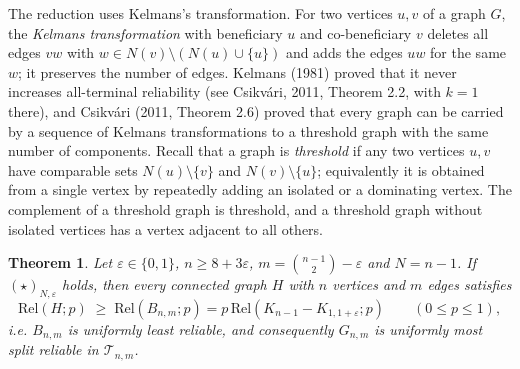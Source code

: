 \documentclass[
  11pt,
]{article}
\newtheorem{theorem}{Theorem}[section]
\theoremstyle{definition}
\theoremstyle{remark}
\begin{document}
The reduction uses Kelmans's transformation. For two vertices \(u,v\) of
a graph \(G\), the \emph{Kelmans transformation} with beneficiary \(u\)
and co-beneficiary \(v\) deletes all edges \(vw\) with
\(w\in N(v)\setminus(N(u)\cup\{u\})\) and adds the edges \(uw\) for the
same \(w\); it preserves the number of edges. Kelmans (1981) proved that
it never increases all-terminal reliability (see Csikvári, 2011, Theorem
2.2, with \(k=1\) there), and Csikvári (2011, Theorem 2.6) proved that
every graph can be carried by a sequence of Kelmans transformations to a
threshold graph with the same number of components. Recall that a graph
is \emph{threshold} if any two vertices \(u,v\) have comparable sets
\(N(u)\setminus\{v\}\) and \(N(v)\setminus\{u\}\); equivalently it is
obtained from a single vertex by repeatedly adding an isolated or a
dominating vertex. The complement of a threshold graph is threshold, and
a threshold graph without isolated vertices has a vertex adjacent to all
others.

\begin{theorem}\label{thm:reduction}
Let $\varepsilon\in\{0,1\}$, $n\ge 8+3\varepsilon$, $m=\binom{n-1}2-\varepsilon$ and $N=n-1$. If $(\star)_{N,\varepsilon}$ holds, then every connected graph $H$ with $n$ vertices and $m$ edges satisfies
$$\mathrm{Rel}(H;p)\;\ge\;\mathrm{Rel}(B_{n,m};p)=p\,\mathrm{Rel}(K_{n-1}-K_{1,1+\varepsilon};p)\qquad(0\le p\le1),$$
i.e. $B_{n,m}$ is uniformly least reliable, and consequently $G_{n,m}$ is uniformly most split reliable in $\mathcal T_{n,m}$.
\end{theorem}
\end{document}
